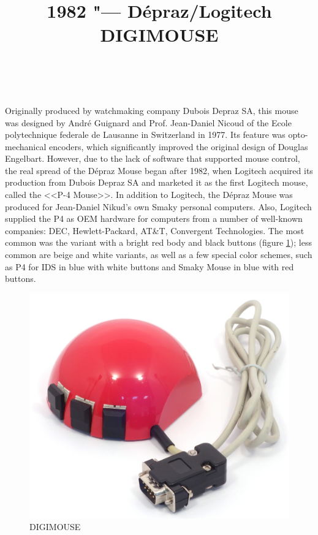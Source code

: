 \documentclass[11pt, a4paper]{article}
\begin{document}
\title{1982 "--- D\'epraz/Logitech DIGIMOUSE}
\date{}
\author{~}
\maketitle
{}
Originally produced by watchmaking company Dubois Depraz SA, this mouse was designed by Andr\'e Guignard and Prof. Jean-Daniel Nicoud of the Ecole polytechnique federale de Lausanne in Switzerland in 1977. Its feature was opto-mechanical encoders, which significantly improved the original design of Douglas Engelbart. However, due to the lack of software that supported mouse control, the real spread of the D\'epraz Mouse began after 1982, when Logitech acquired its production from Dubois Depraz SA and marketed it as the first Logitech mouse, called the <<P-4 Mouse>>.
In addition to Logitech, the D\'epraz Mouse was produced for Jean-Daniel Nikud's own Smaky personal computers. Also, Logitech supplied the P4 as OEM hardware for computers from a number of well-known companies: DEC, Hewlett-Packard, AT\&T, Convergent Technologies. The most common was the variant with a bright red body and black buttons (figure \ref{fig:DIGIMOUSEP4Pic}); less common are beige and white variants, as well as a few special color schemes, such as P4 for IDS in blue with white buttons and Smaky Mouse in blue with red buttons.

\begin{figure}[h]
   \centering
    \includegraphics[scale=0.5]{1982_depraz_digimouse/pic_60.jpg}
    \caption{DIGIMOUSE}
    \label{fig:DIGIMOUSEP4Pic}
\end{figure}
\end{document}
